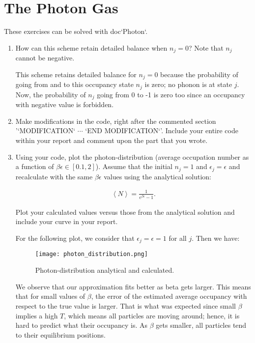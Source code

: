 \documentclass[12pt,letterpaper]{report}
\begin{document}
	\section*{The Photon Gas}
	
	These exercises can be solved with {doc}`Photon`.
	\begin{enumerate}
		\item 
		How can this scheme retain detailed balance when $n_j = 0$? Note that $n_j$ cannot be negative.

		This scheme retains detailed balance for $n_j = 0$ because the probability of going from and to this occupancy state $n_j$ is zero; no phonon is at state $j$. Now, the probability of $n_j$ going from 0 to -1 is zero too since an occupancy with negative value is forbidden. 
		
		\item
		Make modifications in the code, right after the commented section '`MODIFICATION` $\cdots$ `END MODIFICATION`'. Include your entire	code within your report and comment upon the part that you wrote.
		
		\item
		Using your code, plot the photon-distribution (average occupation number as a function of $\beta\epsilon \in [0.1, 2]$). Assume that	the initial $n_j = 1$ and $\epsilon_j = \epsilon$ and recalculate with the same $\beta\epsilon$ values using the analytical solution:
		
		$$
		\begin{aligned}
		\left<N\right> = \frac{1}{e^{\beta\epsilon}-1}.
		\end{aligned}
		$$
		
		Plot your calculated values versus those from the analytical solution and include your curve in your report.
		
		For the following plot, we consider that $\epsilon_{j} = \epsilon = 1$ for all $j$.
		Then we have:
		
		\begin{figure}[H]
			\centering
			\texttt{[image: photon\_distribution.png]}		
			\caption{Photon-distribution analytical and calculated.}
			\label{fig::noDegeneracy}
		\end{figure}  
		
		We observe that our approximation fits better as beta gets larger. This means that for small values of $\beta$, the error of the estimated average occupancy with respect to the true value is larger. That is what was expected since small $\beta$ implies a high $T$, which means all particles are moving around; hence, it is hard to predict what their occupancy is. As $\beta$ gets smaller, all particles tend to their equilibrium positions. 
		

\end{enumerate}
\end{document}
